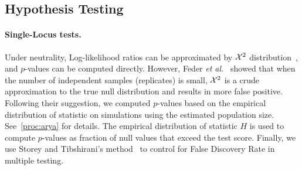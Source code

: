 
\subsection{Hypothesis Testing}
\paragraph{Single-Locus tests.}
Under neutrality, Log-likelihood ratios can be approximated by ${\cal X}^2$
distribution~\cite{williams2001weighing}, and $p$-values can be
computed directly. However, Feder \emph{et
  al.}~\cite{feder2014Identifying} showed that when the number of
independent samples (replicates) is small, ${\cal X}^2$ is a crude
approximation to the true null distribution and results in more false positive. 
Following their suggestion, we computed $p$-values based on the
empirical distribution of statistic on simulations using the estimated
population size. See~\ref{proc:arya} for details.  The empirical
distribution of statistic $H$ is used to compute $p$-values as
fraction of null values that exceed the test score.  Finally, we use
Storey and Tibshirani's method~\cite{storey2003statistical} to control
for False Discovery Rate in multiple testing.



